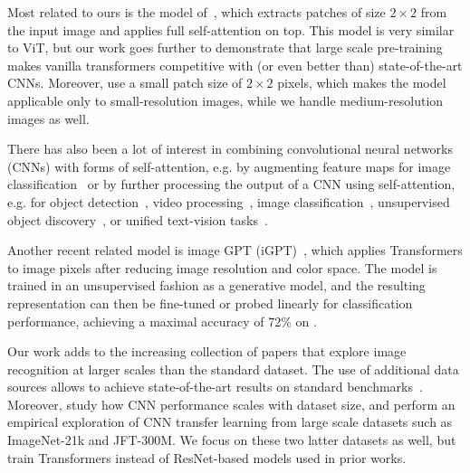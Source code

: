 Most related to ours is the model of~\citet{cordonnier2020-sacnn}, which extracts patches of size $2 \times 2$ from the input image and applies full self-attention on top. This model is very similar to ViT, but our work goes further to demonstrate that large scale pre-training makes vanilla transformers competitive with (or even better than) state-of-the-art CNNs. Moreover, \citet{cordonnier2020-sacnn} use a small patch size of $2 \times 2$ pixels, which makes the model applicable only to small-resolution images, while we handle medium-resolution images as well.

There has also been a lot of interest in combining convolutional neural networks (CNNs) with forms of self-attention, e.g. by augmenting feature maps for image classification~\citep{bello2019-attentionaugmentedcnn} or by further processing the output of a CNN using self-attention, e.g. for object detection~\citep{hu2018-relationnetworks, carion20-detr}, video processing~\citep{wang2018-nonlocalnn,sun2019-videobert}, image classification~\citep{wu2020-visualtransformer}, unsupervised object discovery~\citep{locatello2020-slotattention}, or unified text-vision tasks~\citep{chenuniter,vilbert,visualbert}.

Another recent related model is image GPT (iGPT)~\citep{chen20-igpt}, which applies Transformers to image pixels after reducing image resolution and color space. The model is trained in an unsupervised fashion as a generative model, and the resulting representation can then be fine-tuned or probed linearly for classification performance, achieving a maximal accuracy of 72\% on \imagenet.


Our work adds to the increasing collection of papers that explore image recognition at larger scales than the standard \imagenet dataset.
The use of additional data sources allows to achieve state-of-the-art results on standard benchmarks~\citep{mahajan2018, touvron2019, xie2020-noisystudent}.
Moreover, \citet{sun2017-jft} study how CNN performance scales with dataset size, and \citet{kolesnikov2020-bit, djolonga2020-robustness} perform an empirical exploration of CNN transfer learning from large scale datasets such as ImageNet-21k and JFT-300M.
We focus on these two latter datasets as well, but train Transformers instead of ResNet-based models used in prior works. 





\newcommand{\op}[1]{\operatorname{#1}}
\newcommand{\mbf}[1]{\mathbf{#1}}

